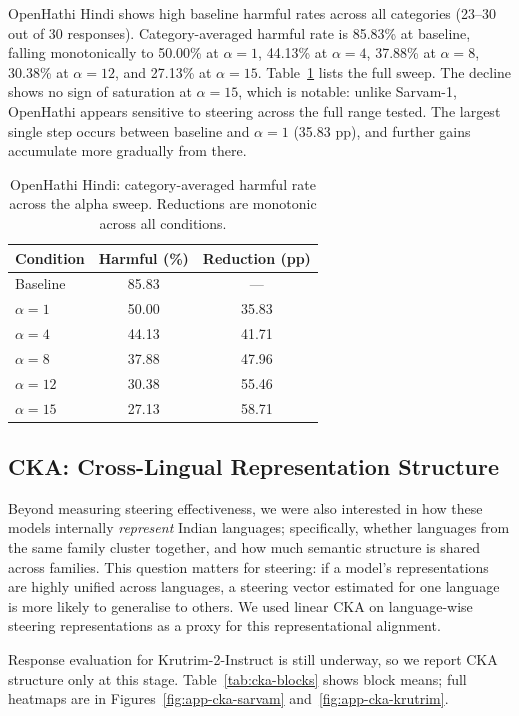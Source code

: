 \documentclass[11pt]{article}
\begin{document}
OpenHathi Hindi shows high baseline harmful rates across all categories (23--30 out of 30 responses). Category-averaged harmful rate is 85.83\% at baseline, falling monotonically to 50.00\% at $\alpha=1$, 44.13\% at $\alpha=4$, 37.88\% at $\alpha=8$, 30.38\% at $\alpha=12$, and 27.13\% at $\alpha=15$. Table~\ref{tab:openhathi-sweep} lists the full sweep. The decline shows no sign of saturation at $\alpha=15$, which is notable: unlike Sarvam-1, OpenHathi appears sensitive to steering across the full range tested. The largest single step occurs between baseline and $\alpha=1$ (35.83 pp), and further gains accumulate more gradually from there.

\begin{table}[t]
\small
\centering
\begin{tabularx}{\columnwidth}{>{\raggedright\arraybackslash}p{} c c}
\toprule
Condition & Harmful (\%) & Reduction (pp) \\
\midrule
Baseline   & 85.83 & --- \\
$\alpha=1$  & 50.00 & 35.83 \\
$\alpha=4$  & 44.13 & 41.71 \\
$\alpha=8$  & 37.88 & 47.96 \\
$\alpha=12$ & 30.38 & 55.46 \\
$\alpha=15$ & 27.13 & 58.71 \\
\bottomrule
\end{tabularx}
\caption{OpenHathi Hindi: category-averaged harmful rate across the alpha sweep. Reductions are monotonic across all conditions.}
\label{tab:openhathi-sweep}
\end{table}

\subsection{CKA: Cross-Lingual Representation Structure}

Beyond measuring steering effectiveness, we were also interested in how these models internally \emph{represent} Indian languages; specifically, whether languages from the same family cluster together, and how much semantic structure is shared across families. This question matters for steering: if a model's representations are highly unified across languages, a steering vector estimated for one language is more likely to generalise to others. We used linear CKA on language-wise steering representations as a proxy for this representational alignment.

Response evaluation for Krutrim-2-Instruct is still underway, so we report CKA structure only at this stage. Table~\ref{tab:cka-blocks} shows block means; full heatmaps are in Figures~\ref{fig:app-cka-sarvam} and~\ref{fig:app-cka-krutrim}.
\end{document}
